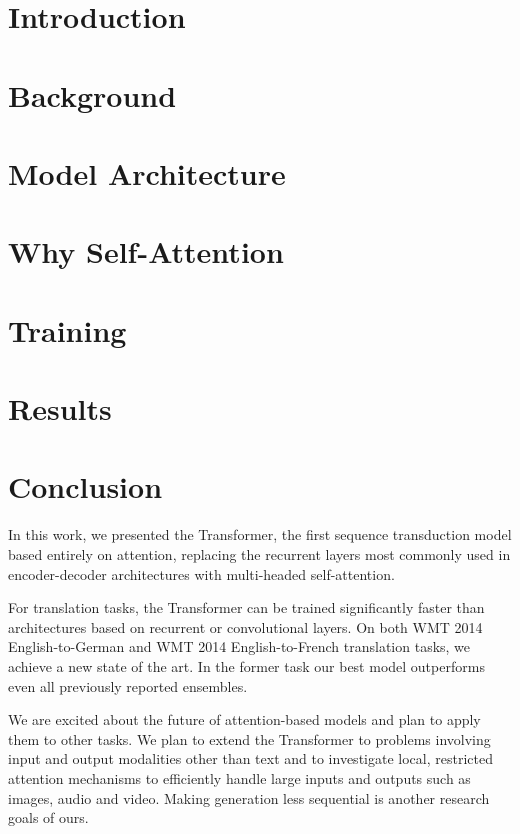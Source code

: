 \documentclass{article}
\begin{document}
\section{Introduction}



\section{Background}



\section{Model Architecture}


\section{Why Self-Attention}


\section{Training}


\section{Results} \label{sec:results}


\section{Conclusion}
In this work, we presented the Transformer, the first sequence transduction
model based entirely on attention, replacing the recurrent layers most commonly
used in encoder-decoder architectures with multi-headed self-attention.

For translation tasks, the Transformer can be trained significantly faster than
architectures based on recurrent or convolutional layers. On both WMT 2014
English-to-German and WMT 2014 English-to-French translation tasks, we achieve
a new state of the art. In the former task our best model outperforms even all
previously reported ensembles. %

We are excited about the future of attention-based models and plan to apply
them to other tasks. We plan to extend the Transformer to problems involving
input and output modalities other than text and to investigate local,
restricted attention mechanisms to efficiently handle large inputs and outputs
such as images, audio and video.
Making generation less sequential is another research goals of ours.
\end{document}
